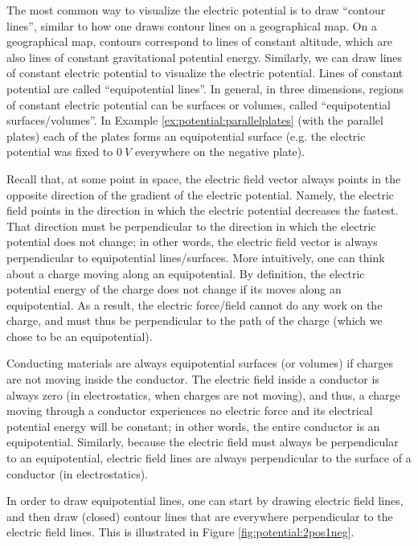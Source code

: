 
The most common way to visualize the electric potential is to draw ``contour lines'', similar to how one draws contour lines on a geographical map. On a geographical map, contours correspond to lines of constant altitude, which are also lines of constant gravitational potential energy. Similarly, we can draw lines of constant electric potential to visualize the electric potential. Lines of constant potential are called ``equipotential lines''. In general, in three dimensions, regions of constant electric potential can be surfaces or volumes, called ``equipotential surfaces/volumes''. In Example \ref{ex:potential:parallelplates} (with the parallel plates) each of the plates forms an equipotential surface (e.g. the electric potential was fixed to $\SI{0}{V}$ everywhere on the negative plate). 

Recall that, at some point in space, the electric field vector always points in the opposite direction of the gradient of the electric potential. Namely, the electric field points in the direction in which the electric potential decreases the fastest. That direction must be perpendicular to the direction in which the electric potential does not change; in other words, the electric field vector is always perpendicular to equipotential lines/surfaces. More intuitively, one can think about a charge moving along an equipotential. By definition, the electric potential energy of the charge does not change if its moves along an equipotential. As a result, the electric force/field cannot do any work on the charge, and must thus be perpendicular to the path of the charge (which we chose to be an equipotential).

Conducting materials are always equipotential surfaces (or volumes) if charges are not moving inside the conductor. The electric field inside a conductor is always zero (in electrostatics, when charges are not moving), and thus, a charge moving through a conductor experiences no electric force and its electrical potential energy will be constant; in other words, the entire conductor is an equipotential. Similarly, because the electric field must always be perpendicular to an equipotential, electric field lines are always perpendicular to the surface of a conductor (in electrostatics).

In order to draw equipotential lines, one can start by drawing electric field lines, and then draw (closed) contour lines that are everywhere perpendicular to the electric field lines. This is illustrated in Figure \ref{fig:potential:2pos1neg}. 

